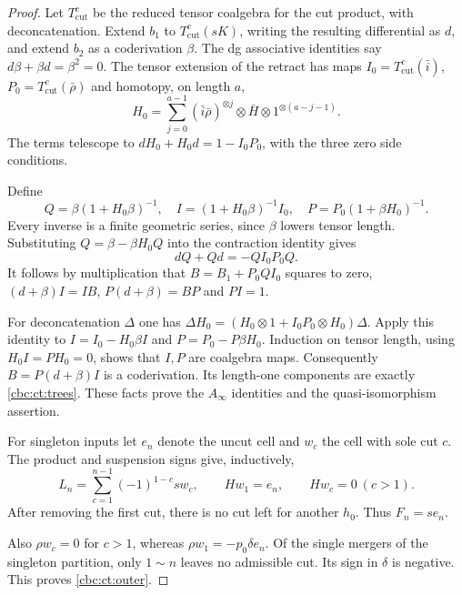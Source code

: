 \begin{proof}
Let $T^c_{\mathrm{cut}}$ be the reduced tensor coalgebra for
the cut product, with deconcatenation. Extend $b_1$ to
$T^c_{\mathrm{cut}}(sK)$, writing the resulting differential
as $d$, and extend $b_2$ as a coderivation
$\beta$. The dg associative identities say
$d\beta+\beta d=\beta^2=0$. The tensor extension of the
retract has maps $I_0=T^c_{\mathrm{cut}}(\bar i)$,
$P_0=T^c_{\mathrm{cut}}(\bar\rho)$ and
homotopy, on length $a$,
\[
 H_0=\sum_{j=0}^{a-1}(\bar i\bar\rho)^{\otimes j}
           \otimes\bar H\otimes1^{\otimes(a-j-1)}.
\]
The terms telescope to $dH_0+H_0d=1-I_0P_0$, with the
three zero side conditions.

Define
\[
 Q=\beta(1+H_0\beta)^{-1},\quad
 I=(1+H_0\beta)^{-1}I_0,\quad
 P=P_0(1+\beta H_0)^{-1}.
\]
Every inverse is a finite geometric series, since $\beta$
lowers tensor length. Substituting
$Q=\beta-\beta H_0Q$ into the contraction identity gives
\[
 dQ+Qd=-QI_0P_0Q.
\]
It follows by multiplication that
$B=B_1+P_0QI_0$ squares to zero,
$(d+\beta)I=IB$, $P(d+\beta)=BP$ and $PI=1$.

For deconcatenation $\Delta$ one has
$\Delta H_0=(H_0\otimes1+I_0P_0\otimes H_0)\Delta$.
Apply this identity to $I=I_0-H_0\beta I$ and
$P=P_0-P\beta H_0$. Induction on tensor length, using
$H_0I=PH_0=0$, shows that $I,P$ are coalgebra maps.
Consequently $B=P(d+\beta)I$ is a coderivation. Its
length-one components are exactly \eqref{cbc:ct:trees}.
These facts prove the $A_\infty$ identities and the
quasi-isomorphism assertion.

For singleton inputs let $e_n$ denote the uncut cell and $w_c$
the cell with sole cut $c$. The product and suspension signs
give, inductively,
\[
 L_n=\sum_{c=1}^{n-1}(-1)^{1-c}s w_c,
       \qquad Hw_1=e_n,\qquad Hw_c=0\ (c>1).
\]
After removing the first cut, there is no cut left for another
$h_0$. Thus $F_n=se_n$.

Also $\rho w_c=0$ for $c>1$,
whereas $\rho w_1=-p_0\delta e_n$. Of the single mergers
of the singleton partition, only $1\sim n$ leaves no admissible
cut. Its sign in $\delta$ is negative. This proves
\eqref{cbc:ct:outer}.
\end{proof}

